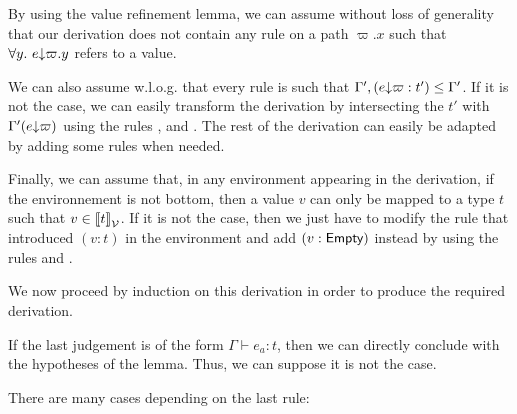 \documentclass[a4paper]{article}
\theoremstyle{definition}
\begin{document}
        By using the value refinement lemma, we can assume without loss of generality that our derivation does not contain
        any rule  on a path $\varpi.x$ such that $\forall y.\ e{\downarrow}\varpi.y$ refers to a value.

        We can also assume w.l.o.g. that every  rule is such that $\Gamma',(e{\downarrow}\varpi:t') \leq \Gamma'$. If it is not the case,
        we can easily transform the derivation by intersecting the $t'$ with $\Gamma'(e{\downarrow}\varpi)$
        using the rules ,  and .
        The rest of the derivation can easily be adapted by adding some  rules when needed.

        Finally, we can assume that, in any environment appearing in the derivation, if the environnement is not bottom,
        then a value $v$ can only be mapped to a type $t$ such that $v\in{\llbracket t \rrbracket}_{\mathcal{V}}$. If it is not the case, then we just have to modify the
         rule that introduced $(v:t)$ in the environment and add $(v:\textsf{Empty})$ instead by using the rules  and .

        We now proceed by induction on this derivation in order to produce the required derivation.
        
        If the last judgement is of the form $\Gamma \vdash e_a: t$, then we can directly conclude with the hypotheses of the lemma.
        Thus, we can suppose it is not the case.

        There are many cases depending on the last rule:
\end{document}
